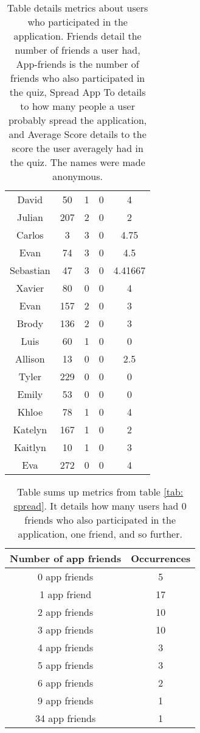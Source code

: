 \documentclass[preprint,12pt]{elsarticle}
\begin{document}
\begin{table}
\begin{tabular}{ c c c c c}
David & 50& 1& 0 & 4 \\
Julian & 207& 2& 0 & 2 \\
Carlos & 3 & 3 & 0 & 4.75 \\
Evan & 74& 3& 0 & 4.5 \\
Sebastian & 47& 3& 0 & 4.41667 \\
Xavier & 80& 0& 0 & 4 \\
Evan & 157& 2& 0 & 3 \\
Brody & 136& 2& 0 & 3 \\
Luis & 60& 1& 0 & 0\\
Allison & 13& 0& 0 & 2.5 \\
Tyler & 229& 0& 0 & 0\\
Emily & 53& 0& 0 & 0\\
Khloe & 78& 1& 0 & 4 \\
Katelyn & 167& 1& 0 & 2 \\
Kaitlyn & 10& 1& 0 & 3 \\
Eva & 272& 0& 0 & 4
\end{tabular}
\caption{Table details metrics about users who participated in the
  application. Friends detail the number of friends a user had,
  App-friends is the number of friends who also participated in the
  quiz, Spread App To details to how many people a user probably
  spread the application, and Average Score details to the score the
  user averagely had in the quiz. The names were made anonymous.}
\end{table}




 \begin{center}
 \begin{table}
 \label{tab:nospread}
 \begin{tabular}{ c c}
Number of app friends & Occurrences \\
\hline
0 app friends & 5 \\
1 app friend & 17 \\
2 app friends & 10 \\
3 app friends & 10 \\
4 app friends & 3 \\
5 app friends & 3\\
6 app friends & 2\\
9 app friends & 1\\
34 app friends & 1 \\
\end{tabular}
\caption{Table sums up metrics from table \ref{tab: spread}. It
  details how many users had 0 friends who also participated in the
  application, one friend, and so further.}
\end{table}
\end{center}
\end{document}
